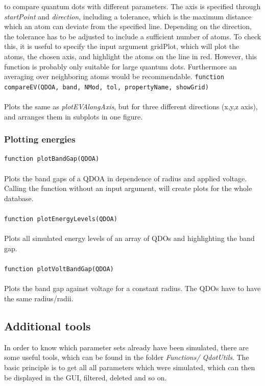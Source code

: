 				 to compare quantum dots with different parameters. The axis is specified through \textit{startPoint} and \textit{direction}, including a tolerance, which is 
				 the maximum distance which an atom can deviate from the specified line. Depending on the direction, the tolerance has to be adjusted to include 
				 a sufficient number of atoms. To check this, it is useful to specify the input argument gridPlot, which will plot the atoms, the chosen axis, and highlight 
				 the atoms on the line in red. However, this function is probably only suitable for large quantum dots. Furthermore an averaging over neighboring atoms 
				 would be recommendable.	\newpage
				\lstinline{function compareEV(QDOA, band, NMod, tol, propertyName, showGrid)}\\\\
				Plots the same as \textit{plotEVAlongAxis}, but for three different directions (x,y,z axis), and arranges them in subplots in one figure.
				
				\subsubsection{Plotting energies}
				\lstinline{function plotBandGap(QDOA)} \\\\
    		Plots the band gaps of a \gls{QDOA} in dependence of radius and applied voltage. Calling the function without an input argument,
    		will create plots for the whole database.\\\\
    		
    		\lstinline{function plotEnergyLevels(QDOA)}\\\\
    		Plots all simulated energy levels of an array of \glspl{QDO} and highlighting the band gap.\\\\
    		
    		\lstinline{function plotVoltBandGap(QDOA)}\\\\
    		Plots the band gap against voltage for a constant radius. The \glspl{QDO} have to have the same radius/radii.
				
				
		\subsection{Additional tools} \label{sec:addTools}
			In order to know which parameter sets already have been simulated, there are some useful tools, which can be found in the folder \textit{Functions/
			QdotUtils}. The basic principle is to get all all parameters which were simulated, which can then be displayed in the GUI, filtered, deleted and so on.
			
